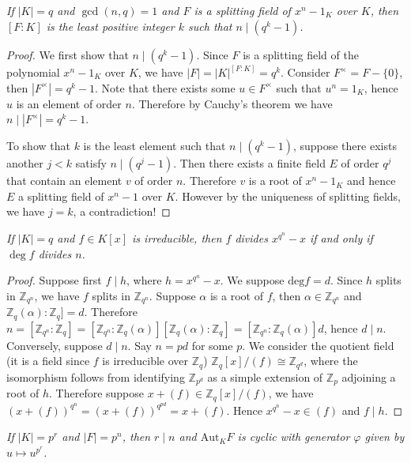 \begin{problem}\em
If $|K|=q$ and $\gcd{(n, q)}=1$ and $F$ is a splitting field of $x^n-1_K$ over $K$, then $[F:K]$ is the least positive integer $k$ such that $n\mid (q^k-1)$.
\end{problem}
\begin{proof}
We first show that $n\mid(q^k-1)$. Since $F$ is a splitting field of the polynomial $x^n-1_K$ over $K$, we have $|F|=|K|^{[F:K]}=q^k$. Consider $F^\times=F-\{0\}$, then $|F^\times|=q^k-1$. Note that there exists some $u\in F^\times$ such that $u^n=1_K$, hence $u$ is an element of order $n$. Therefore by Cauchy's theorem we have $n\mid|F^\times|=q^k-1$.\par
To show that $k$ is the least element such that $n\mid(q^k-1)$, suppose there exists another $j<k$ satisfy $n\mid(q^j-1)$. Then there exists a finite field $E$ of order $q^j$ that contain an element $v$ of order $n$. Therefore $v$ is a root of $x^n-1_K$ and hence $E$ a splitting field of $x^n-1$ over $K$. However by the uniqueness of splitting fields, we have $j=k$, a contradiction!
\end{proof}
\begin{problem}\em
If $|K|=q$ and $f\in K[x]$ is irreducible, then $f$ divides $x^{q^n}-x$ if and only if $\deg{f}$ divides $n$.
\end{problem}
\begin{proof}
Suppose first $f\mid h$, where $h=x^{q^n}-x$. We suppose $\mathrm{deg}f=d$. Since $h$ splits in $\mathbb{Z}_{q^n}$, we have $f$ splits in $\mathbb{Z}_{q^n}$. Suppose $\alpha$ is a root of $f$, then $\alpha\in\mathbb{Z}_{q^n}$ and $\mathbb{Z}_q(\alpha):\mathbb{Z}_q]=d$. Therefore $n=[\mathbb{Z}_{q^n}:\mathbb{Z}_q]=[\mathbb{Z}_{q^n}:\mathbb{Z}_q(\alpha)][\mathbb{Z}_{q}(\alpha):\mathbb{Z}_q]=[\mathbb{Z}_{q^n}:\mathbb{Z}_q(\alpha)]d$, hence $d\mid n$. Conversely, suppose $d\mid n$. Say $n=pd$ for some $p$. We consider the quotient field (it is a field since $f$ is irreducible over $\mathbb{Z}_q$) $\mathbb{Z}_q[x]/(f)\cong\mathbb{Z}_{q^d}$, where the isomorphism follows from identifying $\mathbb{Z}_{p^d}$ as a simple extension of $\mathbb{Z}_p$ adjoining a root of $h$. Therefore suppose $x+(f)\in\mathbb{Z}_q[x]/(f)$, we have $(x+(f))^{q^n}=(x+(f))^{q^{pd}}=x+(f)$. Hence $x^{q^n}-x\in (f)$ and $f\mid h$.
\end{proof}
\begin{problem}\em
If $|K|=p^r$ and $|F|=p^n$, then $r\mid n$ and $\mathrm{Aut}_K F$ is cyclic with generator $\varphi$ given by $u\mapsto u^{p^r}$.
\end{problem}
